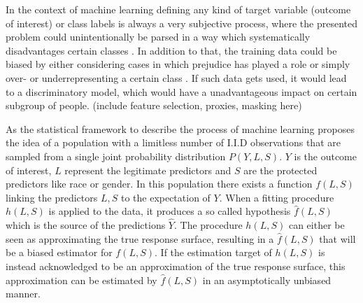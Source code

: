 \label{sec:introduction}
In the context of machine learning defining any kind of target variable (outcome of interest) or class labels is always a very subjective process, where 
the presented problem could unintentionally be parsed in a way which systematically disadvantages 
certain classes \cite{Barocas.2016}. In addition to that, the training data could be biased by 
either considering cases in which prejudice has played a role or simply over- or underrepresenting 
a certain class \cite{Barocas.2016}. If such data gets used, it would lead to a discriminatory model, which would have a unadvantageous impact on certain subgroup of people. (include feature selection, proxies, masking here)

As the statistical framework to describe the process of machine learning \cite{Berk.2018} 
proposes the idea of a population with a limitless number of I.I.D observations that are 
sampled from a single joint probability distribution $P(Y,L,S)$. 
$Y$ is the outcome of interest, $L$ represent the legitimate predictors and $S$ are the 
protected predictors like race or gender. In this population there exists a function $f(L,S)$ 
linking the predictors $L,S$ to the expectation of $Y$. When a fitting procedure $h(L,S)$ 
is applied to the data, it produces a so called hypothesis $\hat{f}(L,S)$ which is the 
source of the predictions $\hat{Y}$. The procedure $h(L,S)$ can either be seen as 
approximating the true response surface, resulting in a $\hat{f}(L,S)$ that will be a biased 
estimator for $f(L,S)$. If the estimation target of $h(L,S)$ is instead acknowledged to be 
an approximation of the true response surface, this approximation can be estimated by 
$\hat{f}(L,S)$ in an asymptotically unbiased manner.